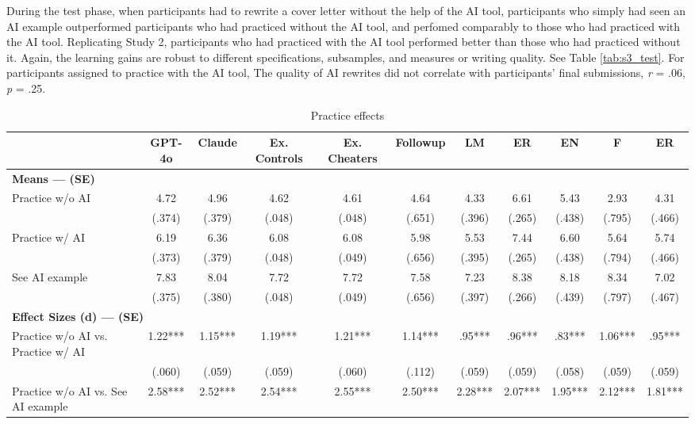 \documentclass[11pt]{report}
\begin{document}
\begin{append}
During the test phase, when participants had to rewrite a cover letter without the help of the AI tool, participants who simply had seen an AI example outperformed participants who had practiced without the AI tool, and perfomed comparably to those who had practiced with the AI tool. Replicating Study 2, participants who had practiced with the AI tool performed better than those who had practiced  without it. Again, the learning gains are robust to different specifications, subsamples, and measures or writing quality. See Table \ref{tab:s3_test}.
For participants assigned to practice with the AI tool, The quality of AI rewrites did not correlate with participants' final submissions, \textit{r} = .06, \textit{p} = .25.
\begin{landscape}
\begin{table}[h]
    \centering
    \footnotesize
    \caption{Practice effects}
   \begin{tabular}{lcccccccccc}
\toprule
  & GPT-4o & Claude & Ex. Controls & Ex. Cheaters & Followup & LM & ER & EN & F & ER \\ 
\midrule
\multicolumn{11}{l}{\textbf{Means --- (SE)}} \\ 
\midrule
Practice w/o AI & 4.72 & 4.96 & 4.62 & 4.61 & 4.64 & 4.33 & 6.61 & 5.43 & 2.93 & 4.31 \\ 
 & (.374) & (.379) & (.048) & (.048) & (.651) & (.396) & (.265) & (.438) & (.795) & (.466) \\ 
Practice w/ AI & 6.19 & 6.36 & 6.08 & 6.08 & 5.98 & 5.53 & 7.44 & 6.60 & 5.64 & 5.74 \\ 
 & (.373) & (.379) & (.048) & (.049) & (.656) & (.395) & (.265) & (.438) & (.794) & (.466) \\ 
See AI example & 7.83 & 8.04 & 7.72 & 7.72 & 7.58 & 7.23 & 8.38 & 8.18 & 8.34 & 7.02 \\ 
 & (.375) & (.380) & (.048) & (.049) & (.656) & (.397) & (.266) & (.439) & (.797) & (.467) \\ 
\midrule
\multicolumn{11}{l}{\textbf{Effect Sizes (d) --- (SE)}} \\ 
\midrule
Practice w/o AI vs. Practice w/ AI & 1.22*** & 1.15*** & 1.19*** & 1.21*** & 1.14*** & .95*** & .96*** & .83*** & 1.06*** & .95*** \\ 
 & (.060) & (.059) & (.059) & (.060) & (.112) & (.059) & (.059) & (.058) & (.059) & (.059) \\ 
Practice w/o AI vs. See AI example & 2.58*** & 2.52*** & 2.54*** & 2.55*** & 2.50*** & 2.28*** & 2.07*** & 1.95*** & 2.12*** & 1.81*** \\ 

\end{tabular}
\end{table}
\end{landscape}
\end{append}
\end{document}
